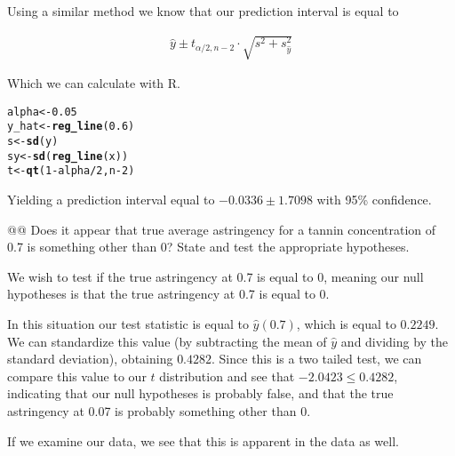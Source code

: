 \documentclass[10pt]{article}\usepackage[]{graphicx}\usepackage[]{xcolor}
\makeatletter
\newcommand{\hlnum}[1]{\textcolor[rgb]{0.686,0.059,0.569}{#1}}%
\newcommand{\hlopt}[1]{\textcolor[rgb]{0,0,0}{#1}}%
\newcommand{\hlstd}[1]{\textcolor[rgb]{0.345,0.345,0.345}{#1}}%
\newcommand{\hlkwb}[1]{\textcolor[rgb]{0.69,0.353,0.396}{#1}}%
\newcommand{\hlkwd}[1]{\textcolor[rgb]{0.737,0.353,0.396}{\textbf{#1}}}%
\newenvironment{kframe}{%
 \def\at@end@of@kframe{}%
 \ifinner\ifhmode%
  \def\at@end@of@kframe{\end{minipage}}%
  \begin{minipage}{\columnwidth}%
 \fi\fi%
 \def\FrameCommand##1{\hskip\@totalleftmargin \hskip-\fboxsep
 \colorbox{shadecolor}{##1}\hskip-\fboxsep
     \hskip-\linewidth \hskip-\@totalleftmargin \hskip\columnwidth}%
 \MakeFramed {\advance\hsize-\width
   \@totalleftmargin\z@ \linewidth\hsize
   \@setminipage}}%
 {\par\unskip\endMakeFramed%
 \at@end@of@kframe}
\newenvironment{knitrout}{}{} %
\makeatother
\begin{document}
\begin{easylist}[enumerate]
    Using a similar method we know that our prediction interval is equal to

    \begin{equation}
        \begin{aligned}
            \hat{y} \pm t_{\alpha / 2, n - 2} \cdot \sqrt{s^2 + s_{\hat{y}}^2}
        \end{aligned}
    \end{equation}

    Which we can calculate with R.

\begin{knitrout}
\color{fgcolor}\begin{kframe}
\begin{alltt}
         \hlstd{alpha} \hlkwb{<-} \hlnum{0.05}
         \hlstd{y_hat} \hlkwb{<-} \hlkwd{reg_line}\hlstd{(}\hlnum{0.6}\hlstd{)}
         \hlstd{s} \hlkwb{<-} \hlkwd{sd}\hlstd{(y)}
         \hlstd{sy} \hlkwb{<-} \hlkwd{sd}\hlstd{(}\hlkwd{reg_line}\hlstd{(x))}
         \hlstd{t} \hlkwb{<-} \hlkwd{qt}\hlstd{(}\hlnum{1} \hlopt{-} \hlstd{alpha} \hlopt{/} \hlnum{2}\hlstd{, n} \hlopt{-} \hlnum{2}\hlstd{)}
\end{alltt}
\end{kframe}
\end{knitrout}


    Yielding a prediction interval equal to $-0.0336 \pm 1.7098$ with 95\% confidence.

    @@ Does it appear that true average astringency for a tannin concentration of 0.7 is something other than 0? State
    and test the appropriate hypotheses.\newline

    We wish to test if the true astringency at 0.7 is equal to 0, meaning our null hypotheses is that the true
    astringency at 0.7 is equal to 0.\newline

    In this situation our test statistic is equal to $\hat{y}(0.7)$, which is equal to $0.2249$. We can
    standardize this value (by subtracting the mean of $\hat{y}$ and dividing by the standard deviation), obtaining
    $0.4282$. Since this is a two tailed test, we can compare
    this value to our $t$ distribution and see that $-2.0423 \le
    0.4282$, indicating that our null hypotheses is probably
    false, and that the true astringency at 0.07 is probably something other than 0.\newline

    If we examine our data, we see that this is apparent in the data as well.


\end{easylist}
\end{document}
